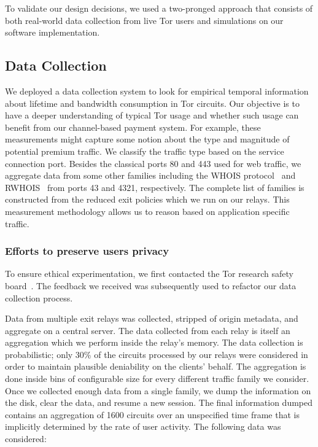 To validate our design decisions, we used a two-pronged approach that consists
of both real-world data collection from live Tor users and simulations on our
software implementation.

\subsection{Data Collection}
\label{subsec:datacollection}

We deployed a data collection system to look for empirical temporal information
about lifetime and bandwidth consumption in Tor circuits. Our objective is to
have a deeper understanding of typical Tor usage and whether such usage can
benefit from our channel-based payment system. For example, these measurements
might capture some notion about the type and magnitude of potential premium
traffic. We classify the traffic type based on the service connection
port. Besides the classical ports 80 and 443 used for web traffic, we aggregate
data from some other families including the WHOIS
protocol~\cite{daigle2004whois} and RWHOIS~\cite{williamson1994referral} from
ports 43 and 4321, respectively. The complete list of families is constructed
from the reduced exit policies which we run on our relays. This measurement
methodology allows us to reason based on application specific traffic.


\subsubsection{Efforts to preserve users privacy}

To ensure ethical experimentation, we first contacted the Tor research safety
board~\cite{torsafety}. The feedback we received was subsequently used to refactor our data
collection process.

Data from multiple exit relays was collected, stripped of origin metadata, and
aggregate on a central server. The data collected from each relay is itself an
aggregation which we perform inside the relay's memory. The data collection is
probabilistic; only 30\% of the circuits processed by our relays were considered
in order to maintain plausible deniability on the clients' behalf. The
aggregation is done inside bins of configurable size for every different traffic
family we consider. Once we collected enough data from a single family, we dump
the information on the disk, clear the data, and resume a new session. The final
information dumped contains an aggregation of 1600 circuits over an unspecified
time frame that is implicitly determined by the rate of user activity. The
following data was considered:

